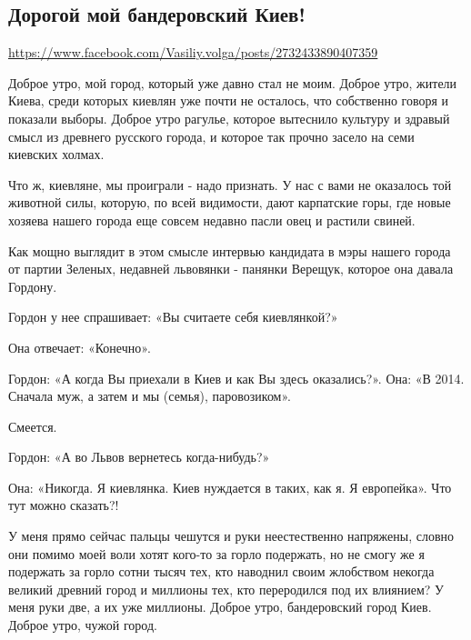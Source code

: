  
 

\subsection{Дорогой мой бандеровский Киев!}
\label{sec:24_10_2020.fb.vasiliy_volga.1.kiev_bander}

\url{https://www.facebook.com/Vasiliy.volga/posts/2732433890407359}

Доброе утро, мой город, который уже давно стал не моим. Доброе утро, жители
Киева, среди которых киевлян уже почти не осталось, что собственно говоря и
показали выборы. Доброе утро рагулье, которое вытеснило культуру и здравый
смысл из древнего русского города, и которое так прочно засело на семи киевских
холмах. 

Что ж, киевляне, мы проиграли - надо признать. У нас с вами не оказалось той
животной силы, которую, по всей видимости, дают карпатские горы, где новые
хозяева нашего города еще совсем недавно пасли овец и растили свиней. 

Как мощно выглядит в этом смысле интервью кандидата в мэры нашего города от
партии Зеленых, недавней львовянки - панянки Верещук, которое она давала
Гордону. 

Гордон у нее спрашивает: «Вы считаете себя киевлянкой?»

Она отвечает: «Конечно».

Гордон: «А когда Вы приехали в Киев и как Вы здесь оказались?».  Она: «В 2014.
Сначала муж, а затем и мы (семья), паровозиком». 

Смеется. 

Гордон: «А во Львов вернетесь когда-нибудь?»

Она: «Никогда. Я киевлянка. Киев нуждается в таких, как я. Я европейка».  Что
тут можно сказать?! 

У меня прямо сейчас пальцы чешутся и руки неестественно напряжены, словно они
помимо моей воли хотят кого-то за горло подержать, но не смогу же я подержать
за горло сотни тысяч тех, кто наводнил своим жлобством некогда великий древний
город и миллионы тех, кто переродился под их влиянием? У меня руки две, а их
уже миллионы.  Доброе утро, бандеровский город Киев. Доброе утро, чужой город.

